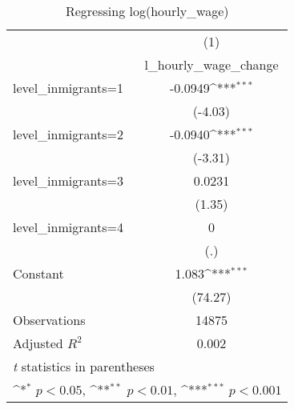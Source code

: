 \begin{table}[htbp]\centering
\def\sym#1{\ifmmode^{#1}\else\(^{#1}\)\fi}
\caption{Regressing log(hourly\_wage)}
\begin{tabular}{l*{1}{c}}
\hline\hline
                    &\multicolumn{1}{c}{(1)}\\
                    &\multicolumn{1}{c}{l\_hourly\_wage\_change}\\
\hline
level\_inmigrants=1  &     -0.0949\sym{***}\\
                    &     (-4.03)         \\
[1em]
level\_inmigrants=2  &     -0.0940\sym{***}\\
                    &     (-3.31)         \\
[1em]
level\_inmigrants=3  &      0.0231         \\
                    &      (1.35)         \\
[1em]
level\_inmigrants=4  &           0         \\
                    &         (.)         \\
[1em]
Constant            &       1.083\sym{***}\\
                    &     (74.27)         \\
\hline
Observations        &       14875         \\
Adjusted \(R^{2}\)  &       0.002         \\
\hline\hline
\multicolumn{2}{l}{\footnotesize \textit{t} statistics in parentheses}\\
\multicolumn{2}{l}{\footnotesize \sym{*} \(p<0.05\), \sym{**} \(p<0.01\), \sym{***} \(p<0.001\)}\\
\end{tabular}
\end{table}
